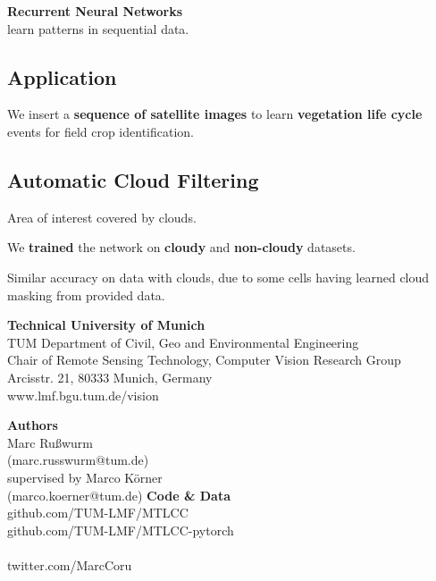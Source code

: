 \documentclass[a0]{tumposter}
\newcommand{\pre}[1]{
	{\color{focusone}\textbf{#1}}
}
\begin{document}
\begin{minipage}{0.35\linewidth} 
\textbf{Recurrent Neural Networks} \\ learn patterns in sequential data.

\vspace{-.5em}
\subsection{Application}
We insert a \pre{sequence of satellite images} to learn \textbf{vegetation life cycle} events for field crop identification.

\subsection{Automatic Cloud Filtering}
Area of interest covered by clouds.


We \textbf{trained} the network on \textbf{cloudy} and \textbf{non-cloudy} datasets.

Similar accuracy on data with clouds, due to some cells having learned cloud masking from provided data.
	
\end{minipage}
\hspace{2em}
\begin{minipage}{0.6\linewidth}
	\figseqencnetwork
\end{minipage}


%




\begin{footer}
	\begin{multicols}{2}
		\textbf{Technical University of Munich}\\
		TUM Department of Civil, Geo and Environmental Engineering \\
		Chair of Remote Sensing Technology, Computer Vision Research Group \\
		Arcisstr. 21, 80333 Munich, Germany \\
		www.lmf.bgu.tum.de/vision
		\vfill\columnbreak
		\begin{multicols}{2}
			\textbf{Authors} \\
			Marc Rußwurm \\ (marc.russwurm@tum.de) \\
			supervised by Marco Körner \\ (marco.koerner@tum.de)
			\vfill
			\columnbreak
			\textbf{Code \& Data} \\
			github.com/TUM-LMF/MTLCC \\
			github.com/TUM-LMF/MTLCC-pytorch \\
			\\
			twitter.com/MarcCoru
			\vfill
			\fancywhitespace		
		\end{multicols}
		
		
	\end{multicols}
\end{footer}
\end{document}
